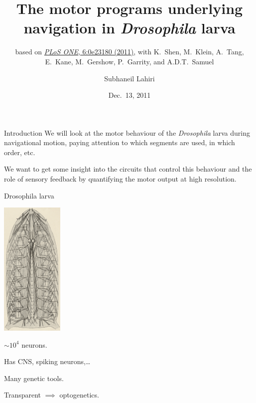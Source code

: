 \documentclass{beamer}%
\title[Motor programs in Drosophila larvae]{The motor programs underlying navigation in \emph{Drosophila} larva}
\subtitle{\small{based on \href{http://dx.doi.org/10.1371/journal.pone.0023180}{\emph{PLoS
  ONE}, 6:\penalty0e23180 (2011)},
  with  K.~Shen, M.~Klein, A.~Tang, E.~Kane, M.~Gershow, P.~Garrity, and A.D.T.~Samuel}\nocite{Lahiri2011larvamotor}}
\author{Subhaneil Lahiri%
}
\institute[Harvard]{%
Harvard University
}
\date{Dec.\ 13, 2011}
\begin{document}

\begin{frame}
%
 \titlepage
%
\end{frame}


\begin{frame}{Introduction}
%
 We will look at the motor behaviour of the \emph{Drosophila} larva during navigational motion, paying attention to which segments are used, in which order, etc.

 \vp We want to get some insight into the circuits that control this behaviour and the role of sensory feedback by quantifying the motor output at high resolution.

%
\end{frame}



\begin{frame}{Drosophila larva}
%
 \parbox{5cm}{
   \includegraphics[width=3cm]{Figs/HertweckNervousSys.png}\\
 }
 \parbox{6cm}{
   $\sim10^4$ neurons.

   \vp Has CNS, spiking neurons,\ldots{}

   \vp Many genetic tools.

   \vp Transparent $\implies$ optogenetics.
 }
%
\end{frame}

%
%
%
%
\end{document}
